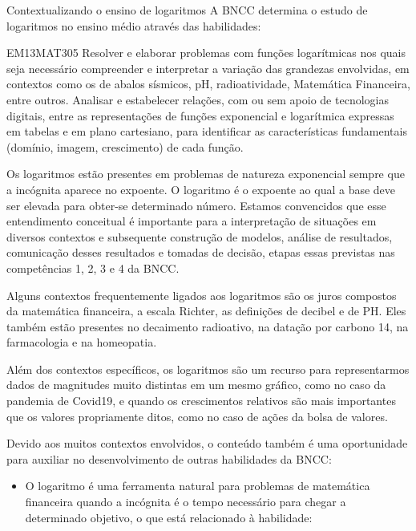\begin{apresentacao}{Contextualizando o ensino de logaritmos}
A BNCC determina o estudo de logaritmos no ensino médio através das habilidades:

\begin{habilities}{EM13MAT305}
Resolver e elaborar problemas com funções logarítmicas nos quais seja necessário compreender e interpretar a variação das grandezas envolvidas, em contextos como os de abalos sísmicos, pH, radioatividade, Matemática Financeira, entre outros.
Analisar e estabelecer relações, com ou sem apoio de tecnologias digitais, entre as representações de funções exponencial e logarítmica expressas em tabelas e em plano cartesiano, para identificar as características fundamentais (domínio, imagem, crescimento) de cada função.
\end{habilities}

Os logaritmos estão presentes em problemas de natureza exponencial sempre que a incógnita aparece no expoente. O logaritmo é o expoente ao qual a base deve ser elevada para obter-se determinado número. Estamos convencidos que esse entendimento conceitual é importante para a interpretação de situações em diversos contextos e subsequente construção de modelos, análise de resultados, comunicação desses resultados e  tomadas de decisão, etapas essas previstas nas competências 1, 2, 3 e 4 da BNCC.


Alguns contextos frequentemente ligados aos logaritmos são os juros compostos da matemática financeira, a escala Richter, as definições de decibel e de PH. Eles também estão presentes no decaimento radioativo, na datação por carbono 14, na farmacologia e na homeopatia.

Além dos contextos específicos, os logaritmos são um recurso para representarmos dados de magnitudes muito distintas em um mesmo gráfico, como no caso da pandemia de Covid19, e quando os crescimentos relativos são mais importantes que os valores propriamente ditos, como no caso de ações da bolsa de valores.

Devido aos muitos contextos envolvidos, o conteúdo também é uma oportunidade para auxiliar no desenvolvimento de outras habilidades da BNCC:
\begin{itemize}
\item O logaritmo é uma ferramenta natural para problemas de matemática financeira quando a incógnita é o tempo necessário para chegar a determinado objetivo, o que está relacionado à habilidade:
\end{itemize}


\end{apresentacao}
